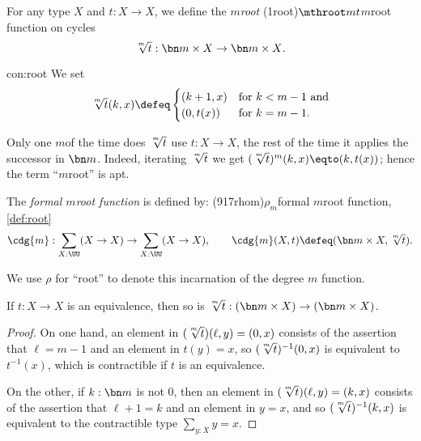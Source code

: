 \begin{construction}\label{con:root}
  For any type $X$ and $t:X\to X$, we define the $m$\th \emph{root}%
  \glossary(1root){$\protect\mthroot mt$}{$m$\th root function on cycles}
 \[
    {\textstyle\sqrt[\uproot{2}m]t} : {\bn m\times X} \to {\bn m\times X}.
  \]
\end{construction}
\begin{implementation}{con:root}
  We set
  \[
    {\textstyle\sqrt[\uproot{2}m]t}(k,x)\defeq
    \begin{cases}
      (k+1,x)& \text{for $k<m-1$ and}\\
      (0,t(x))& \text{for $k=m-1$}.
    \end{cases}
  \]
\par \vspace{-1.5\baselineskip}
\qedhere
\end{implementation}
Only one $m$\th of the time does $\sqrt[\uproot{2}m]t$ use $t:X\to X$,
the rest of the time it applies the successor in $\bn m$.
Indeed, iterating $\sqrt[\uproot{2}m]t$
we get $(\sqrt[\uproot{2}m]t)^m(k,x)\eqto(k,t(x))$;
hence the term ``$m$\th root'' is apt.

\begin{definition}\label{def:root}
  The \emph{formal $m$\th root function} is defined by:
  \glossary(917rhom){$\rho_m$}{formal $m$\th root function, \cref{def:root}}
  \[
    \cdg{m}:\sum_{X:\UU}(X\to X)\to\sum_{X:\UU}(X\to X),\qquad
    \cdg{m}(X,t)\defeq(\bn m\times X,{\textstyle\sqrt[\uproot{2}m]t}).\qedhere
  \]
\end{definition}
\noindent We use $\rho$ for ``root'' to denote this incarnation
of the degree $m$ function.

\begin{lemma}\label{lem:root-pres-equiv}
  If $t:X\to X$ is an equivalence,
  then so is $\sqrt[\uproot{2}m]t : (\bn m\times X) \to (\bn m\times X)$.
\end{lemma}
\begin{proof}
  On one hand, an element in  $(\sqrt[\uproot{2}m]t)(\ell,y) = (0,x)$ consists
  of the assertion that  $\ell=m-1$ and an element in $t(y)=x$,
  so  $(\sqrt[\uproot{2}m]t)^{-1}(0,x)$ is equivalent
  to $t^{-1}(x)$, which is contractible if $t$ is an equivalence.

  On the other, if $k:\bn m$ is not $0$,
  then an element in $(\sqrt[\uproot{2}m]t)(\ell,y)=(k,x)$
  consists of the assertion that $\ell+1=k$ and an element in $y=x$,
  and so $(\sqrt[\uproot{2}m]t)^{-1}(k,x)$ is equivalent
  to the contractible type $\sum_{y:X}y=x$.
\end{proof}

